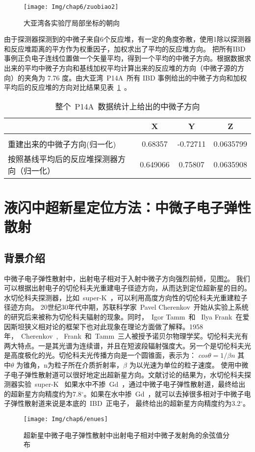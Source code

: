 \begin{figure}[!htbp]
  \centering
   \texttt{[image: Img/chap6/zuobiao2]}
    \caption{大亚湾各实验厅局部坐标的朝向}
  \label{fig:ehangu}
\end{figure}

由于探测器探测到的中微子来自6个反应堆，有一定的角度弥散，使用1除以探测器和反应堆距离的平方作为权重因子，加权求出了平均的反应堆方向。 把所有IBD事例正负电子连线位置做一个矢量平均，得到一个平均的中微子方向。根据数据求出来的平均中微子方向和基线加权平均计算出来的反应堆的方向（中微子源的方向）的夹角为 7.76 度。由大亚湾~P14A~所有 IBD 事例给出的中微子方向和加权平均后的反应堆的方向对比结果见表~\ref{tab:t64}~。
\begin{table}[htbp]
\centering  %
\begin{tabular}{lccc}  %
\hline
&X &Y&Z\\\hline
\\重建出来的中微子方向(归一化)&0.68357 & -0.72711&0.0635799
\\按照基线平均后的反应堆探测器方向（归一化）&0.649066&0.75807&0.0635908
\\ \hline
\end{tabular}
\caption{整个~P14A~数据统计上给出的中微子方向}
\label{tab:t64}
\end{table}
\section{液闪中超新星定位方法：中微子电子弹性散射}
\subsection{背景介绍}
中微子电子弹性散射中，出射电子相对于入射中微子方向强烈前倾，见图\ref{fig:enues}。 我们可以根据出射电子的切伦科夫光重建电子径迹方向，从而达到定位超新星的目的。水切伦科夫探测器，比如~super-K~，可以利用高度方向性的切伦科夫光重建粒子径迹方向。
20世纪30年代中期，苏联科学家~Pavel Cherenkov~开始从实验上系统的研究后来被称为切伦科夫辐射的现象。同时，~Igor Tamm~和 ~Ilya Frank~在爱因斯坦狭义相对论的框架下也对此现象在理论方面做了解释。1958年，~Cherenkov~, ~Frank~和~Tamm~三人被授予诺贝尔物理学奖。切伦科夫光有两大特点。一是其光谱为连续谱，并且在短波段辐射强度大。另一个是切伦科夫光是高度极化的光。切伦科夫光传播方向是一个圆锥面，表示为：
$cos\theta = 1/ \beta n $
其中$\theta$ 为锥角，n为粒子所在介质折射率，$\beta$ 为以光速为单位的粒子速度。
使用中微子电子弹性散射道可以很好地定出超新星方向。文献\citep{tomas2003supernova}讨论的结果为，水切伦科夫探测器实验~super-K~ 如果水中不掺~Gd~，通过中微子电子弹性散射道，最终给出的超新星方向精度约为7.8$ ^\circ $。如果在水中掺~Gd~，就可以去掉很多相对于中微子电子弹性散射道来说是本底的~IBD~正电子， 最终给出的超新星方向精度约为3.2$^\circ$。
\begin{figure}[!htbp]
  \centering
   \texttt{[image: Img/chap6/enues]}
    \caption{超新星中微子电子弹性散射中出射电子相对中微子发射角的余弦值分布}
  \label{fig:enues}
\end{figure}
